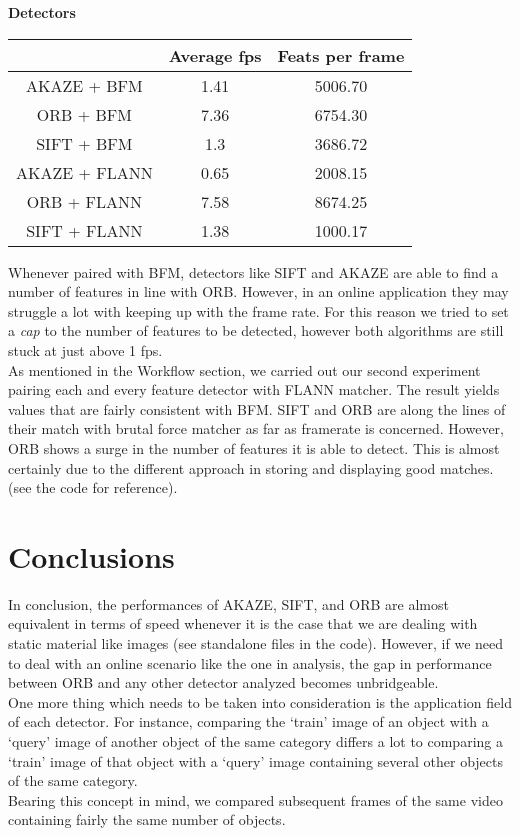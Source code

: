 \documentclass[conference]{IEEEtran}
\begin{document}
\begin{center}
    \textbf{Detectors}\\
\end{center}

\begin{center}
    \begin{tabular}{||c c c||}
     \hline
     & Average fps & Feats per frame \\ [0.5ex]
     \hline\hline
     AKAZE + BFM & 1.41 & 5006.70 \\
     \hline
     ORB + BFM & 7.36 & 6754.30 \\
     \hline
     SIFT + BFM & 1.3 & 3686.72 \\
     \hline
     \hline
     AKAZE + FLANN & 0.65 & 2008.15 \\
     \hline
     ORB + FLANN & 7.58 & 8674.25 \\
     \hline
     SIFT + FLANN & 1.38 & 1000.17 \\
     \hline
    \end{tabular}
\end{center}

Whenever paired with BFM, detectors like SIFT and AKAZE are able to find a number of features in line with ORB. However, in an online application they may struggle a lot with keeping up with the frame rate. For this reason we tried to set a \textit{cap} to the number of features to be detected, however both algorithms are still stuck at just above 1 fps.\\
As mentioned in the Workflow section, we carried out our second experiment pairing each and every feature detector with FLANN matcher. The result yields values that are fairly consistent with BFM. SIFT and ORB are along the lines of their match with brutal force matcher as far as framerate is concerned. However, ORB shows a surge in the number of features it is able to detect. This is almost certainly due to the different approach in storing and displaying good matches. (see the code for reference).


\section{Conclusions}
In conclusion, the performances of AKAZE, SIFT, and ORB are almost equivalent in terms of speed whenever it is the case that we are dealing with static material like images (see standalone files in the code). However, if we need to deal with an online scenario like the one in analysis, the gap in performance between ORB and any other detector analyzed becomes unbridgeable.\\
One more thing which needs to be taken into consideration is the application field of each detector. For instance, comparing the `train' image of an object with a `query' image of another object of the same category differs a lot to comparing a `train' image of that object with a `query' image containing several other objects of the same category.\\
Bearing this concept in mind, we compared subsequent frames of the same video containing fairly the same number of objects.
\end{document}
